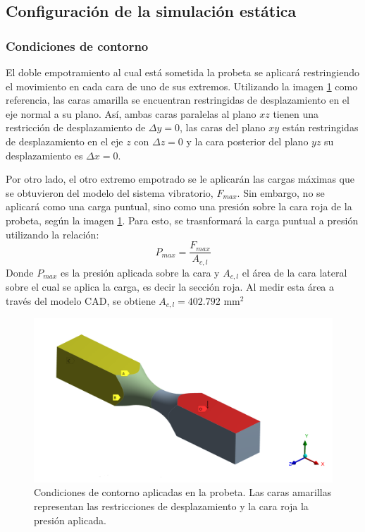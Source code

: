 \newpage			%

\subsection{Configuración de la simulación estática}
\subsubsection{Condiciones de contorno}
El doble empotramiento al cual está sometida la probeta se aplicará restringiendo el movimiento en cada cara de uno de sus extremos. Utilizando la imagen \ref{fig:cond_borde} como referencia, las caras amarilla se encuentran restringidas de desplazamiento en el eje normal a su plano. Así, ambas caras paralelas al plano $xz$ tienen una restricción de desplazamiento de $\Delta y = 0$, las caras del plano $xy$ están restringidas de desplazamiento en el eje $z$ con $\Delta z = 0$ y la cara posterior del plano $yz$ su desplazamiento es $\Delta x = 0$.

Por otro lado, el otro extremo empotrado se le aplicarán las cargas máximas que se obtuvieron del modelo del sistema vibratorio, $F_{max}$. Sin embargo, no se aplicará como una carga puntual, sino como una presión sobre la cara roja de la probeta, según la imagen \ref{fig:cond_borde}. Para esto, se trasnformará la carga puntual a presión utilizando la relación:
\begin{equation}\label{eq:p_max}
	P_{max} = \frac{F_{max}}{A_{c,l}}
\end{equation}
Donde $P_{max}$ es la presión aplicada sobre la cara y $A_{c,l}$ el área de la cara lateral sobre el cual se aplica la carga, es decir la sección roja. Al medir esta área a través del modelo CAD, se obtiene $A_{c,l} = 402.792 \text{ mm}^2$

\begin{figure}[]
\centering
\includegraphics[width=0.7\linewidth]{Imagenes/cond_borde.png}
\caption{Condiciones de contorno aplicadas en la probeta. Las caras amarillas representan las restricciones de desplazamiento y la cara roja la presión aplicada.}
\label{fig:cond_borde}
\end{figure}


